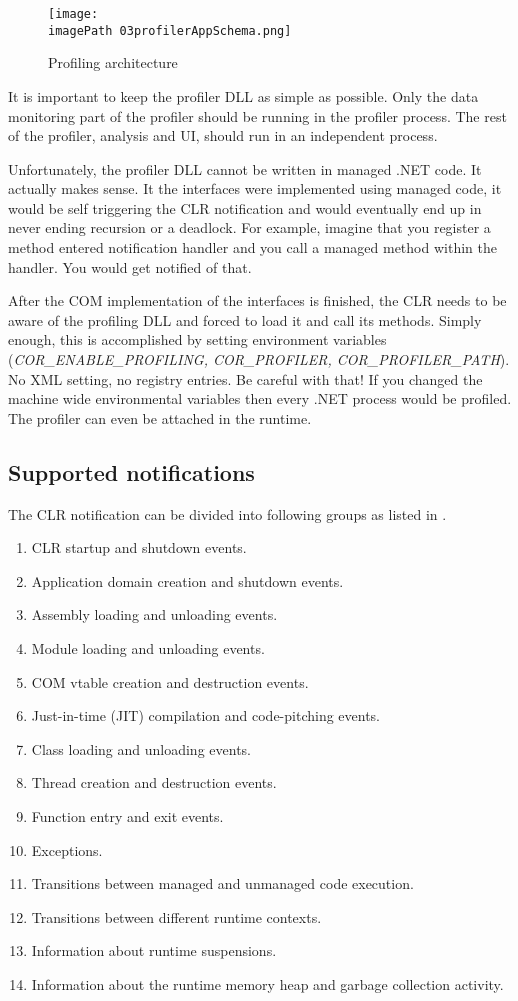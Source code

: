\begin{figure}
	\centering
		\texttt{[image: \\imagePath 03profilerAppSchema.png]}
		\caption{Profiling architecture \cite{ProfMSDN} }
	\label{fig:03profilerAppSchema}
\end{figure}

It is important to keep the profiler DLL as simple as possible. Only the data monitoring part of the profiler should be running in the profiler process. The rest of the profiler, analysis and UI, should run in an independent process.

Unfortunately, the profiler DLL cannot be written in managed .NET code. It actually makes sense. It the interfaces were implemented using managed code, it would be self triggering the CLR notification and would eventually end up in never ending recursion or a deadlock. For example, imagine that you register a method entered notification handler and you call a managed method within the handler. You would get notified of that.

After the COM implementation of the interfaces is finished, the CLR needs to be aware of the profiling DLL and forced to load it and call its methods. Simply enough, this is accomplished by setting
 environment variables (\textit{COR\_ENABLE\_PROFILING, COR\_PROFILER, COR\_PROFILER\_PATH}). No XML setting, no registry entries. Be careful with that! If you changed the machine wide environmental variables then every .NET process would be profiled. The profiler can even be attached in the runtime.

\subsection{Supported notifications}
The CLR notification can be divided into following groups as listed in \cite{ProfMSDN}.

\begin{enumerate}
\item CLR startup and shutdown events.
\item Application domain creation and shutdown events.
\item Assembly loading and unloading events.
\item Module loading and unloading events.
\item COM vtable creation and destruction events.
\item Just-in-time (JIT) compilation and code-pitching events.
\item Class loading and unloading events.
\item Thread creation and destruction events.
\item Function entry and exit events.
\item Exceptions.
\item Transitions between managed and unmanaged code execution.
\item Transitions between different runtime contexts.
\item Information about runtime suspensions.
\item Information about the runtime memory heap and garbage collection activity.
\end{enumerate}

